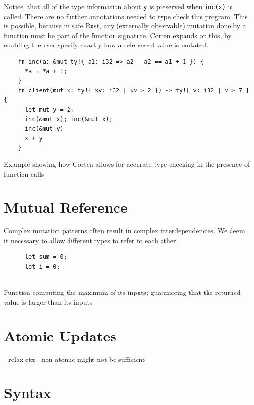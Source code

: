 \documentclass{book}
\newcommand{\code}[1]{\texttt{#1}}
\theoremstyle{definition}
\begin{document}
Notice, that all of the type information about \code{y} is preserved when \code{inc(x)} is called. There are no further annotations needed to type check this program. This is possible, because in safe Rust, any (externally observable) mutation done by a function must be part of the function signature. Corten expands on this, by enabling the user specify exactly how a referenced value is mutated.

\begin{listing}[h]
  \begin{verbatim}
    fn inc(a: &mut ty!{ a1: i32 => a2 | a2 == a1 + 1 }) {
      *a = *a + 1;
    }
    fn client(mut x: ty!{ xv: i32 | xv > 2 }) -> ty!{ v: i32 | v > 7 } {
      let mut y = 2;
      inc(&mut x); inc(&mut x);
      inc(&mut y)
      x + y
    }
  \end{verbatim}
  \caption{Example showing how Corten allows for accurate type checking in the presence of function calls }
  \label{lst:modular-calls}
\end{listing}



\label{subsec:mutual-reference}\section{Mutual Reference}

Complex mutation patterns often result in complex interdependencies. We deem it necessary to allow different types to refer to each other.

\begin{listing}[h]
  \begin{verbatim}
      let sum = 0;
      let i = 0;
      
  \end{verbatim}
  \caption{Function computing the maximum of its inputs; guaraneeing that the returned value is larger than its inputs}
  \label{lst:mutual-reference}
\end{listing}

\label{subsec:atomic-updates}\section{Atomic Updates}

- relax ctx
- non-atomic might not be sufficient


\section{Syntax}
\end{document}
